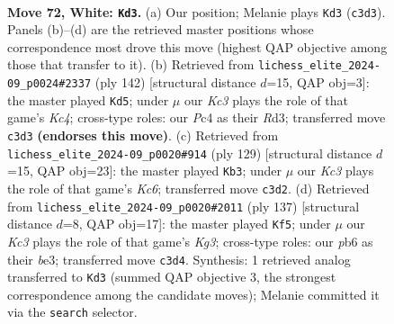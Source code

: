 \documentclass[11pt]{article}
\begin{document}
\clearpage

\begin{figure}[p]\centering
\begin{subfigure}{0.46\textwidth}\centering
\resizebox{\linewidth}{!}{%
\newchessgame
\chessboard[
  setfen={8/8/1p6/p7/q1P5/2K5/7k/8 w - - 0 72},
  showmover=false,
  pgfstyle=straightmove, color=movearrow, markmove={c3-d3}
]}
\caption{}
\end{subfigure}\hfill
\begin{subfigure}{0.46\textwidth}\centering
\resizebox{\linewidth}{!}{%
\newchessgame
\chessboard[
  setfen={8/8/8/p7/q1K5/3R4/1k6/8 w - - 0 72},
  showmover=false,
  pgfstyle=straightmove, color=movearrow, markmove={c4-d5}
]}
\caption{}
\end{subfigure}
\\[4pt]
\begin{subfigure}{0.46\textwidth}\centering
\resizebox{\linewidth}{!}{%
\newchessgame
\chessboard[
  setfen={8/8/7p/7P/5Q2/2k2PPK/8/8 b - - 0 65},
  showmover=false,
  pgfstyle=straightmove, color=movearrow, markmove={c3-b3}
]}
\caption{}
\end{subfigure}\hfill
\begin{subfigure}{0.46\textwidth}\centering
\resizebox{\linewidth}{!}{%
\newchessgame
\chessboard[
  setfen={8/8/6k1/7p/7Q/4B2P/6K1/8 b - - 8 69},
  showmover=false,
  pgfstyle=straightmove, color=movearrow, markmove={g6-f5}
]}
\caption{}
\end{subfigure}
\caption{\textbf{Move 72, White: \texttt{Kd3}.} (a) Our position; Melanie plays \texttt{Kd3} (\texttt{c3d3}). Panels (b)--(d) are the retrieved master positions whose correspondence most drove this move (highest QAP objective among those that transfer to it). (b) Retrieved from \texttt{lichess\_elite\_2024-09\_p0024\#2337} (ply 142) [structural distance $d$=15, QAP obj=3]: the master played \texttt{Kd5}; under $\mu$ our \emph{Kc3} plays the role of that game's \emph{Kc4}; cross-type roles: our \emph{P}c4 as their \emph{R}d3; transferred move \texttt{c3d3} \textbf{(endorses this move)}. (c) Retrieved from \texttt{lichess\_elite\_2024-09\_p0020\#914} (ply 129) [structural distance $d$=15, QAP obj=23]: the master played \texttt{Kb3}; under $\mu$ our \emph{Kc3} plays the role of that game's \emph{Kc6}; transferred move \texttt{c3d2}. (d) Retrieved from \texttt{lichess\_elite\_2024-09\_p0020\#2011} (ply 137) [structural distance $d$=8, QAP obj=17]: the master played \texttt{Kf5}; under $\mu$ our \emph{Kc3} plays the role of that game's \emph{Kg3}; cross-type roles: our \emph{p}b6 as their \emph{b}e3; transferred move \texttt{c3d4}. Synthesis: 1 retrieved analog transferred to \texttt{Kd3} (summed QAP objective 3, the strongest correspondence among the candidate moves); Melanie committed it via the \texttt{search} selector.}
\label{fig:thought-m142}
\end{figure}
\end{document}

